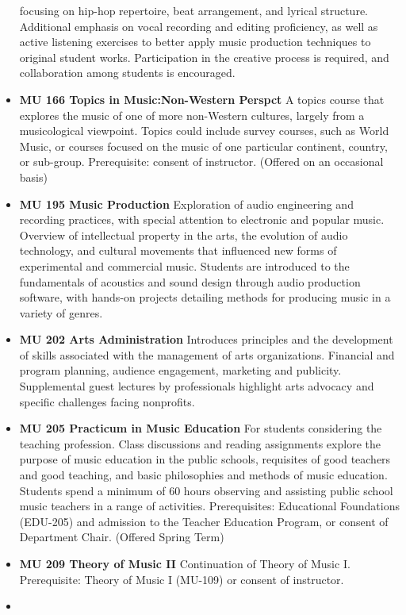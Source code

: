 \documentclass[
  letterpaper,
]{scrbook}
\begin{document}
\begin{itemize}
  focusing on hip-hop repertoire, beat arrangement, and lyrical
  structure. Additional emphasis on vocal recording and editing
  proficiency, as well as active listening exercises to better apply
  music production techniques to original student works. Participation
  in the creative process is required, and collaboration among students
  is encouraged.
\item
  \textbf{MU 166 Topics in Music:Non-Western Perspct} A topics course
  that explores the music of one of more non-Western cultures, largely
  from a musicological viewpoint. Topics could include survey courses,
  such as World Music, or courses focused on the music of one particular
  continent, country, or sub-group. Prerequisite: consent of instructor.
  (Offered on an occasional basis)
\item
  \textbf{MU 195 Music Production} Exploration of audio engineering and
  recording practices, with special attention to electronic and popular
  music. Overview of intellectual property in the arts, the evolution of
  audio technology, and cultural movements that influenced new forms of
  experimental and commercial music. Students are introduced to the
  fundamentals of acoustics and sound design through audio production
  software, with hands-on projects detailing methods for producing music
  in a variety of genres.
\item
  \textbf{MU 202 Arts Administration} Introduces principles and the
  development of skills associated with the management of arts
  organizations. Financial and program planning, audience engagement,
  marketing and publicity. Supplemental guest lectures by professionals
  highlight arts advocacy and specific challenges facing nonprofits.
\item
  \textbf{MU 205 Practicum in Music Education} For students considering
  the teaching profession. Class discussions and reading assignments
  explore the purpose of music education in the public schools,
  requisites of good teachers and good teaching, and basic philosophies
  and methods of music education. Students spend a minimum of 60 hours
  observing and assisting public school music teachers in a range of
  activities. Prerequisites: Educational Foundations (EDU-205) and
  admission to the Teacher Education Program, or consent of Department
  Chair. (Offered Spring Term)
\item
  \textbf{MU 209 Theory of Music II} Continuation of Theory of Music I.
  Prerequisite: Theory of Music I (MU-109) or consent of instructor.
\item

\end{itemize}
\end{document}
